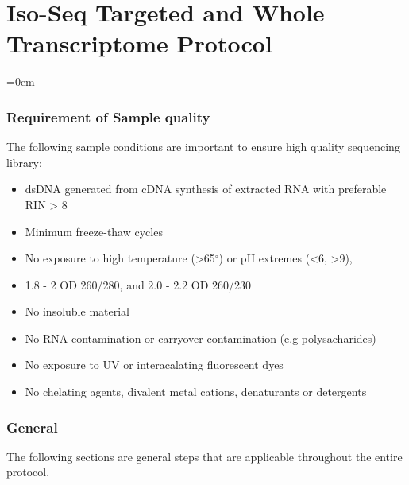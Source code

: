 \chapter{Iso-Seq Targeted and Whole Transcriptome Protocol}\label{app_longread_protocol}
\label{app_longread_protocol}

\begingroup
\parindent=0em
\localtableofcontents 
\endgroup
\subsection{Requirement of Sample quality}
The following sample conditions are important to ensure high quality sequencing library: 
\begin{itemize}
	\item dsDNA generated from cDNA synthesis of extracted RNA with preferable RIN > 8
	\item Minimum freeze-thaw cycles 
	\item No exposure to high temperature (>65$^{\circ}$) or pH extremes (<6, >9), 
	\item 1.8 - 2 OD 260/280, and 2.0 - 2.2 OD 260/230 
	\item No insoluble material  
	\item No RNA contamination or carryover contamination (e.g polysacharides)
	\item No exposure to UV or interacalating fluorescent dyes 
	\item No chelating agents, divalent metal cations, denaturants or detergents
	
\end{itemize}

\subsection{General}
The following sections are general steps that are applicable throughout the entire protocol. 

